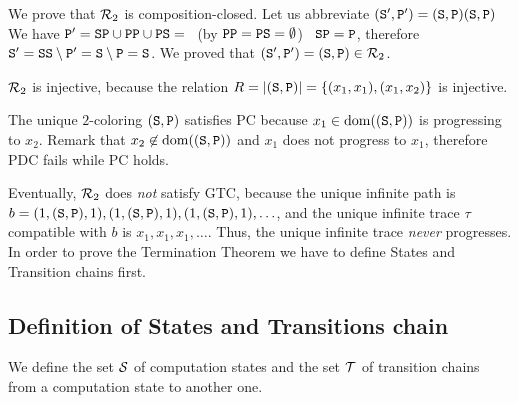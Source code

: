 \documentclass{lmcs}
\begin{document}
We prove that ${\mathcal R}_2$ is composition-closed.
Let us abbreviate $({\tt S}',{\tt P}') =({\tt S},{\tt P})({\tt S},{\tt P})$
We have 
$
{\tt P}' =
{\tt S}{\tt P} \cup {\tt P}{\tt P} \cup {\tt P}{\tt S} = 
$ \ (by ${\tt P}{\tt P} = {\tt P}{\tt S} = \emptyset$) \ $
{\tt S}{\tt P} = 
{\tt P}
$, therefore
${\tt S}' = {\tt S}{\tt S} \setminus {\tt P}' = {\tt S} \setminus {\tt P} = {\tt S}$.
We proved that
$
({\tt S}',{\tt P}') =
({\tt S},{\tt P}) \in {\mathcal R}_2
$.

${\mathcal R}_2$ is injective, because the relation 
$R = {| ({\tt S},{\tt P}) |} = \{(x_1,x_1), (x_1,x_2)\}$ is injective.

The unique $2$-coloring $({\tt S},{\tt P})$ satisfies PC 
because $x_1 \in {\rm dom}(({\tt S},{\tt P}))$
is progressing to  $x_2$. Remark that $x_2 \not \in {\rm dom}(({\tt S},{\tt P}))$
and $x_1$ does not progress to $x_1$, therefore PDC fails while PC holds. 

Eventually, ${\mathcal R}_2$ does \emph{not} satisfy GTC, because the unique infinite path is 
$b = (1,({\tt S},{\tt P}),1), (1,({\tt S},{\tt P}),1), (1,({\tt S},{\tt P}),1), \ldots$,
and the unique infinite trace $\tau$ compatible with $b$ is 
$x_1,x_1,x_1, \ldots$. 
Thus, the unique infinite trace \emph{never} progresses. 
\\






In order to prove the Termination Theorem we have to define States and
Transition chains first.


\subsection{Definition of States and Transitions chain}
\label{subsection-transition}

We define the set ${\mathcal S}$ of computation states and the set ${\mathcal T}$ of 
transition chains from a computation state to another one.
\end{document}
